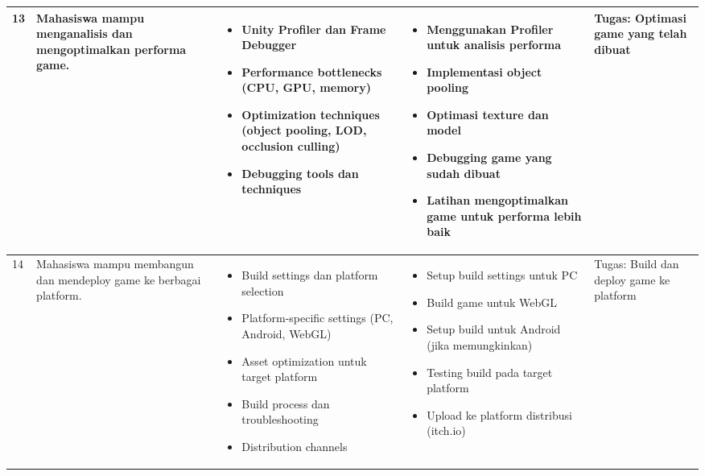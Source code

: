 \documentclass[a4paper,12pt]{article}
\begin{document}
\begin{longtable}{|p{0.8cm}|p{3.5cm}|p{4cm}|p{4cm}|p{2.5cm}|}
13 & Mahasiswa mampu menganalisis dan mengoptimalkan performa game. & 
\begin{itemize}[leftmargin=*,nosep]
\item Unity Profiler dan Frame Debugger
\item Performance bottlenecks (CPU, GPU, memory)
\item Optimization techniques (object pooling, LOD, occlusion culling)
\item Debugging tools dan techniques
\end{itemize} & 
\begin{itemize}[leftmargin=*,nosep]
\item Menggunakan Profiler untuk analisis performa
\item Implementasi object pooling
\item Optimasi texture dan model
\item Debugging game yang sudah dibuat
\item Latihan mengoptimalkan game untuk performa lebih baik
\end{itemize} & 
Tugas: Optimasi game yang telah dibuat \\
\hline

14 & Mahasiswa mampu membangun dan mendeploy game ke berbagai platform. & 
\begin{itemize}[leftmargin=*,nosep]
\item Build settings dan platform selection
\item Platform-specific settings (PC, Android, WebGL)
\item Asset optimization untuk target platform
\item Build process dan troubleshooting
\item Distribution channels
\end{itemize} & 
\begin{itemize}[leftmargin=*,nosep]
\item Setup build settings untuk PC
\item Build game untuk WebGL
\item Setup build untuk Android (jika memungkinkan)
\item Testing build pada target platform
\item Upload ke platform distribusi (itch.io)
\end{itemize} & 
Tugas: Build dan deploy game ke platform \\
\hline


\end{longtable}
\end{document}
